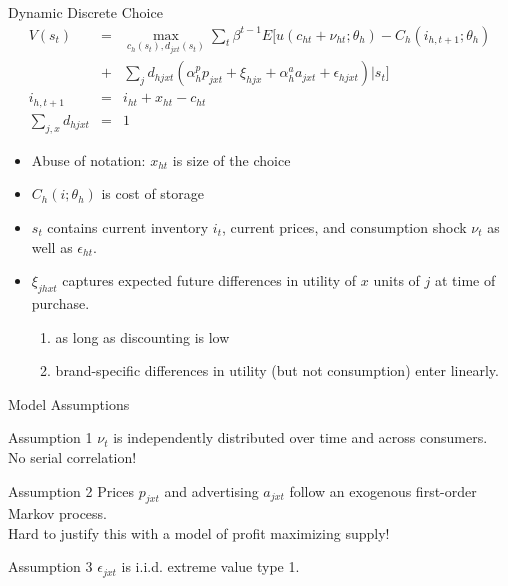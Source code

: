 \documentclass[xcolor=pdftex,dvipsnames,table,mathserif,aspectratio=169]{beamer}
\begin{document}
\begin{frame}{Dynamic Discrete Choice}
\footnotesize
\begin{eqnarray*}
V(s_t)&=& \max_{c_h(s_t),d_{jxt}(s_t)} \sum_t \beta^{t-1} E[ u(c_{ht}+\nu_{ht}; \theta_h) - C_h(i_{h,t+1};\theta_h) \\
&+&\sum_j d_{hjxt} (\alpha_h^p p_{jxt} + \xi_{hjx} + \alpha_h^a a_{jxt} + \epsilon_{hjxt} )| s_t]\\
i_{h,t+1} &=& i_{ht} + x_{ht} - c_{ht}\\
\sum_{j,x} d_{hjxt} &=& 1
\end{eqnarray*}
\begin{itemize}
\item Abuse of notation: $x_{ht}$ is size of the choice
\item $C_h(i; \theta_h)$ is cost of storage
\item $s_t$ contains current inventory $i_t$, current prices, and consumption shock $\nu_t$ as well as $\epsilon_{ht}$.
\item $\xi_{jhxt}$ captures expected future differences in utility of $x$ units of $j$ at time of purchase.
\begin{enumerate}
\item as long as discounting is low
\item brand-specific differences in utility (but not consumption) enter linearly.
\end{enumerate}
\end{itemize}
\end{frame}

\begin{frame}{Model Assumptions}
\begin{block}{Assumption 1}
$\nu_t$ is independently distributed over time and across consumers.\\
 \alert{No serial correlation!}
\end{block}
\begin{block}{Assumption 2}
Prices $p_{jxt}$ and advertising $a_{jxt}$ follow an exogenous first-order Markov process.\\
\alert{Hard to justify this with a model of profit maximizing supply!}
\end{block}
\begin{block}{Assumption 3}
$\epsilon_{jxt}$ is i.i.d. extreme value type 1.
\end{block}
\end{frame}
\end{document}
